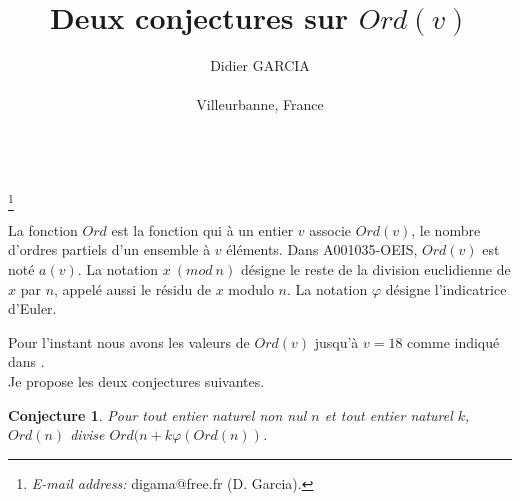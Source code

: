 \documentclass[12pt]{article}
\newtheorem{conjecture}[definition]{{\bf Conjecture}}
\begin{document}
	
	
	
	
	
	
	
	
	\title{\bf{Deux conjectures sur $Ord(v)$
}}
	\author{\small Didier GARCIA \\
		\centerline{  {\small Villeurbanne, France}}\\
	}
	\maketitle
	\footnote{
		{\it E-mail address:}
		 digama@free.fr (D. Garcia).
	}
	
	\vspace{-1.4cm}
	
%
%

 La fonction $Ord$ est  la fonction qui \`a un entier $v$ associe $Ord(v)$, le nombre
d'ordres partiels d'un ensemble à $v$ \'el\'ements.
Dans A001035-OEIS,  $Ord(v)$ est not\'e $a(v)$. 
La notation $x \ (mod \ n)$ d\'esigne le reste de la division euclidienne de $x$ par $n$, appel\'e aussi le résidu de $x$ modulo $n$. La notation $\varphi$ d\'esigne  l'indicatrice d'Euler.

\noindent Pour l'instant nous avons les valeurs  de $Ord(v)$ jusqu'\`a  $v = 18$ comme indiqué dans \cite{sloane}.\\

Je propose les deux conjectures suivantes.

\begin{conjecture}
Pour tout entier naturel non nul $n$ et tout entier naturel $k$, $Ord(n)$ divise $
Ord(n+k\varphi(Ord(n))$.
\end{conjecture}
\end{document}
